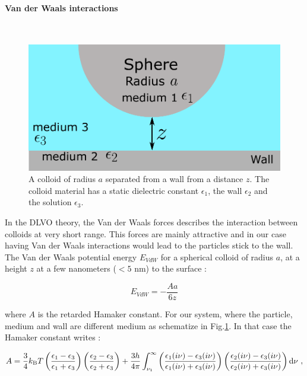 \paragraph{Van der Waals interactions}\mbox{}\\
\vspace{0.10cm}

\begin{figure}[h]
	\centering
	\includegraphics{02_body/chapter3/images/vdw_scheme.pdf}
	\caption{A colloid of radius $a$ separated from a wall from a distance $z$. The colloid material has a static dielectric constant $\epsilon_1$, the wall $\epsilon_2$ and the solution $\epsilon_3$. }
	\label{Fig:vdw}
\end{figure}

In the DLVO theory, the Van der Waals forces describes the interaction between colloids at very short range. This forces are mainly attractive and in our case having Van der Waals interactions would lead to the particles stick to the wall. The Van der Waals potential energy $E_{VdW}$ for a spherical colloid of radius $a$, at a height $z$  at a few nanometers ($< 5$ nm) to the surface \cite{israelachvili_intermolecular_2015}:

\begin{equation}
	E_{VdW} = -\frac{A a}{6z} 
\end{equation}

where $A$ is the retarded Hamaker constant. For our system, where the particle, medium and wall are different medium as schematize in Fig.\ref{Fig:vdw}. In that case the Hamaker constant writes \cite{israelachvili_intermolecular_2015}:

\begin{equation}
	A = \frac{3}{4} k_\mathrm{B}T \left(
	\frac{\epsilon_1 - \epsilon_3}{\epsilon_1 + \epsilon_3}
	\right)
	\left(
	\frac{\epsilon_2 - \epsilon_3}{\epsilon_2 + \epsilon_3}
	\right)
	+
	\frac{3h}{4\pi}
	\int_{\nu_1}^{\infty}
	\left(
	\frac{\epsilon_1 (i\nu) - \epsilon_3 (i\nu)}{\epsilon_1 (i\nu) + \epsilon_3 (i\nu)}
	\right)
	\left(
	\frac{\epsilon_2 (i\nu) - \epsilon_3 (i\nu)}{\epsilon_2 (i\nu) + \epsilon_3 (i\nu)}
	\right)
	\textnormal{d}\nu ~,
\end{equation}

